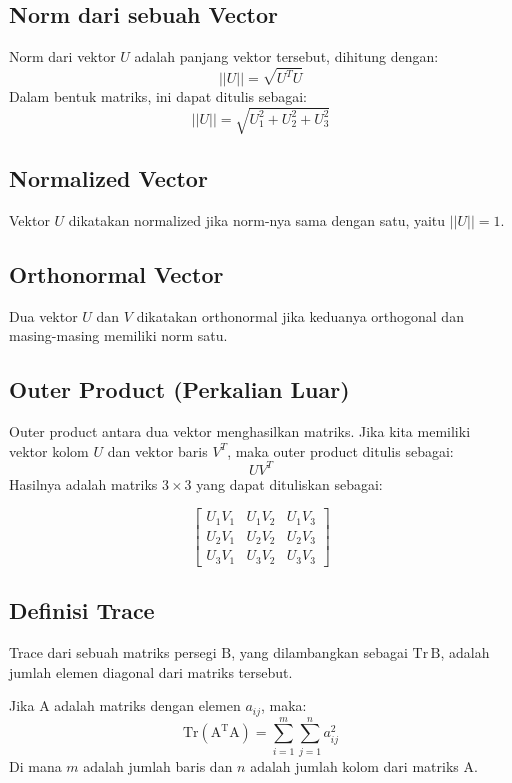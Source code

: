 \documentclass{article}
\begin{document}
\subsection{Norm dari sebuah Vector}
Norm dari vektor \( U \) adalah panjang vektor tersebut, dihitung dengan: \[ || U || = \sqrt{U^T U} \] Dalam bentuk matriks, ini dapat ditulis sebagai: \[ || U || = \sqrt{U_1^2 + U_2^2 + U_3^2} \]

\subsection{Normalized Vector}
Vektor \( U \) dikatakan normalized jika norm-nya sama dengan satu, yaitu \( || U || = 1 \).

\subsection{Orthonormal Vector}
Dua vektor \( U \) dan \( V \) dikatakan orthonormal jika keduanya orthogonal dan masing-masing memiliki norm satu.

\subsection{Outer Product (Perkalian Luar)}
Outer product antara dua vektor menghasilkan matriks. Jika kita memiliki vektor kolom \( U \) dan vektor baris \( V^T \), maka outer product ditulis sebagai: \[ UV^T \] Hasilnya adalah matriks \( 3 \times 3 \) yang dapat dituliskan sebagai:

\[ \begin{bmatrix} U_1 V_1 & U_1 V_2 & U_1 V_3 \\ U_2 V_1 & U_2 V_2 & U_2 V_3 \\ U_3 V_1 & U_3 V_2 & U_3 V_3 \end{bmatrix} \]

\subsection{Definisi Trace}
Trace dari sebuah matriks persegi \( \text{B} \), yang dilambangkan sebagai \( \text{Tr} \, \text{B} \), adalah jumlah elemen diagonal dari matriks tersebut.

Jika \( \text{A} \) adalah matriks dengan elemen \( a_{ij} \), maka: \[ \text{Tr}(\text{A}^{\text{T}} \text{A}) = \sum_{i=1}^{m} \sum_{j=1}^{n} a_{ij}^2 \] Di mana \( m \) adalah jumlah baris dan \( n \) adalah jumlah kolom dari matriks \( \text{A} \).
\end{document}
